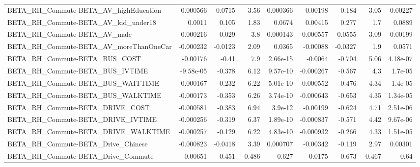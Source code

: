 \begin{tabular}{lrrrrrrrr}
BETA\_RH\_Commute-BETA\_AV\_highEducation              &    0.000566 &       0.0715 &     3.56 & 0.000366 &    0.00198 &       0.184 &         3.05 &       0.00227 \\
BETA\_RH\_Commute-BETA\_AV\_kid\_under18                &      0.0011 &        0.105 &     1.83 &   0.0674 &    0.00415 &       0.277 &          1.7 &        0.0889 \\
BETA\_RH\_Commute-BETA\_AV\_male                       &    0.000216 &        0.029 &      3.8 & 0.000143 &   0.000557 &      0.0555 &         3.09 &       0.00199 \\
BETA\_RH\_Commute-BETA\_AV\_moreThanOneCar             &   -0.000232 &      -0.0123 &     2.09 &   0.0365 &   -0.00088 &     -0.0327 &          1.9 &        0.0571 \\
BETA\_RH\_Commute-BETA\_BUS\_COST                      &    -0.00176 &        -0.41 &      7.9 & 2.66e-15 &    -0.0064 &      -0.704 &         5.06 &      4.18e-07 \\
BETA\_RH\_Commute-BETA\_BUS\_IVTIME                    &   -9.58e-05 &       -0.378 &     6.12 & 9.57e-10 &  -0.000267 &      -0.567 &          4.3 &       1.7e-05 \\
BETA\_RH\_Commute-BETA\_BUS\_WAITTIME                  &   -0.000167 &       -0.232 &     6.22 & 5.01e-10 &  -0.000552 &      -0.476 &         4.34 &       1.4e-05 \\
BETA\_RH\_Commute-BETA\_BUS\_WALKTIME                  &   -0.000173 &       -0.353 &     6.26 & 3.74e-10 &  -0.000643 &      -0.653 &         4.35 &      1.34e-05 \\
BETA\_RH\_Commute-BETA\_DRIVE\_COST                    &   -0.000581 &       -0.383 &     6.94 &  3.9e-12 &   -0.00199 &      -0.624 &         4.71 &      2.51e-06 \\
BETA\_RH\_Commute-BETA\_DRIVE\_IVTIME                  &   -0.000256 &       -0.319 &     6.37 & 1.89e-10 &  -0.000837 &      -0.571 &         4.42 &      9.67e-06 \\
BETA\_RH\_Commute-BETA\_DRIVE\_WALKTIME                &   -0.000257 &       -0.129 &     6.22 & 4.83e-10 &  -0.000932 &      -0.266 &         4.33 &      1.51e-05 \\
BETA\_RH\_Commute-BETA\_Drive\_Chinese                 &   -0.000823 &      -0.0418 &     3.39 & 0.000707 &   -0.00342 &      -0.119 &         2.97 &       0.00301 \\
BETA\_RH\_Commute-BETA\_Drive\_Commute                 &     0.00651 &        0.451 &   -0.486 &    0.627 &     0.0175 &       0.673 &       -0.467 &          0.64 \\

\end{tabular}
